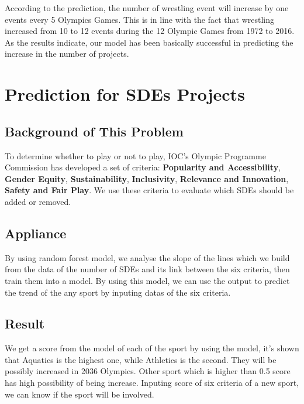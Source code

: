 \documentclass[a4paper]{article}
\begin{document}
According to  the prediction, the number of wrestling event will increase by one events every 5 Olympics Games. This is in line with the fact that wrestling increased from 10 to 12 events during the 12 Olympic Games from 1972 to 2016.
As the results indicate, our model has been basically successful in predicting the increase in the number of projects.



\section{Prediction for SDEs Projects}
\subsection{Background of This Problem}
To determine whether to play or not to play, IOC’s Olympic Programme Commission has developed a set of 
criteria: \textbf{Popularity and Accessibility}, \textbf{Gender Equity},  \textbf{Sustainability}, \textbf{Inclusivity}, \textbf{Relevance and Innovation}, \textbf{Safety and Fair Play}. We use these criteria to evaluate which SDEs should be added or removed.
\subsection{Appliance}
By using random forest model, we analyse the slope of the lines which we build from the data of the number of SDEs and its link between the six criteria, then train them into a model. By using this model, we can use the output to predict the trend of the any sport by inputing datas of the six criteria.
\subsection{Result}
We get a score from the model of each of the sport by using the model, it's shown that Aquatics is the highest one, while Athletics is the second. They will be possibly increased in 2036 Olympics. Other sport which is higher than 0.5 score has high possibility of being increase. Inputing score of six criteria of a new sport, we can know if the sport will be involved.
\end{document}
